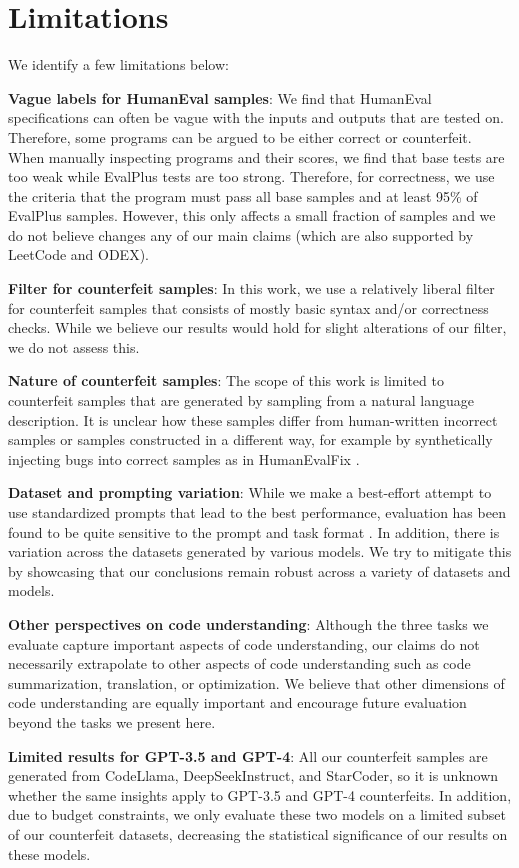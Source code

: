 \section{Limitations}
We identify a few limitations below:

\textbf{Vague labels for HumanEval samples}: We find that HumanEval specifications can often be vague with the inputs and outputs that are tested on. Therefore, some programs can be argued to be either correct or counterfeit. When manually inspecting programs and their scores, we find that base tests are too weak while EvalPlus tests are too strong. Therefore, for correctness, we use the criteria that the program must pass all base samples and at least 95\% of EvalPlus samples. However, this only affects a small fraction of samples and we do not believe changes any of our main claims (which are also supported by LeetCode and ODEX). 

\textbf{Filter for counterfeit samples}: In this work, we use a relatively liberal filter for counterfeit samples that consists of mostly basic syntax and/or correctness checks. While we believe our results would hold for slight alterations of our filter, we do not assess this.

\textbf{Nature of counterfeit samples}: The scope of this work is limited to counterfeit samples that are generated by sampling from a natural language description. It is unclear how these samples differ from human-written incorrect samples or samples constructed in a different way, for example by synthetically injecting bugs into correct samples as in HumanEvalFix \citep{muennighoff2023octopack}.

\textbf{Dataset and prompting variation}: While we make a best-effort attempt to use standardized prompts that lead to the best performance, evaluation has been found to be quite sensitive to the prompt and task format \citep{mizrahi2023state}. In addition, there is variation across the datasets generated by various models. We try to mitigate this by showcasing that our conclusions remain robust across a variety of datasets and models. 

\textbf{Other perspectives on code understanding}: Although the three tasks we evaluate capture important aspects of code understanding, our claims do not necessarily extrapolate to other aspects of code understanding such as code summarization, translation, or optimization. We believe that other dimensions of code understanding are equally important and encourage future evaluation beyond the tasks we present here.

\textbf{Limited results for GPT-3.5 and GPT-4}: All our counterfeit samples are generated from CodeLlama, DeepSeekInstruct, and StarCoder, so it is unknown whether the same insights apply to GPT-3.5 and GPT-4 counterfeits. In addition, due to budget constraints, we only evaluate these two models on a limited subset of our counterfeit datasets, decreasing the statistical significance of our results on these models. 